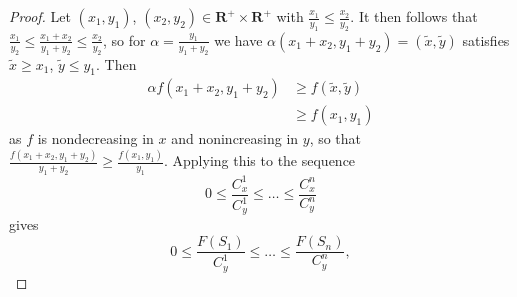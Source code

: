 \documentclass{article}
\theoremstyle{case}
\begin{document}
\begin{proof}
Let $(x_1,y_1)$, $(x_2,y_2) \in \mathbf{R}^+ \times \mathbf{R}^+$ with $\frac{x_1}{y_1} \leq \frac{x_2}{y_2}$. It then follows that $\frac{x_1}{y_2} \leq \frac{x_1 + x_2}{y_1 + y_2} \leq \frac{x_2}{y_2}$, so for $\alpha = \frac{y_1}{y_1 + y_2}$ we have $\alpha(x_1 + x_2, y_1 + y_2) = (\tilde{x}, \tilde{y})$ satisfies $\tilde{x} \geq x_1$, $\tilde{y} \leq y_1$. Then
\begin{align*}
\alpha f(x_1 + x_2, y_1 + y_2) &\geq f(\tilde{x}, \tilde{y}) \\
&\geq f(x_1,y_1)
\end{align*}
as $f$ is nondecreasing in $x$ and nonincreasing in $y$, so that $\frac{f(x_1 + x_2,y_1 + y_2)}{y_1 + y_2} \geq \frac{f(x_1, y_1)}{y_1}$. Applying this to the sequence
\[
0 \leq \frac{C_x^1}{C_y^1} \leq \dots \leq \frac{C_x^n}{C_y^n}
\]
gives
\begin{equation}\label{eqn10}
0 \leq \frac{F(S_1)}{C_y^1} \leq \dots \leq \frac{F(S_n)}{C_y^n},
\end{equation}


\end{proof}
\end{document}
